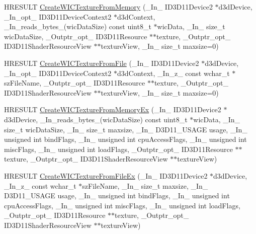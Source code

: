 \begin{DoxyCompactItemize}
\item 
H\+R\+E\+S\+U\+LT \hyperlink{namespace_direct_x_aee4c0625ab4946a88b594747ccca02a2}{Create\+W\+I\+C\+Texture\+From\+Memory} (\+\_\+\+In\+\_\+ I\+D3\+D11\+Device2 $\ast$d3d\+Device, \+\_\+\+In\+\_\+opt\+\_\+ I\+D3\+D11\+Device\+Context2 $\ast$d3d\+Context, \+\_\+\+In\+\_\+reads\+\_\+bytes\+\_\+(wic\+Data\+Size) const uint8\+\_\+t $\ast$wic\+Data, \+\_\+\+In\+\_\+ size\+\_\+t wic\+Data\+Size, \+\_\+\+Outptr\+\_\+opt\+\_\+ I\+D3\+D11\+Resource $\ast$$\ast$texture, \+\_\+\+Outptr\+\_\+opt\+\_\+ I\+D3\+D11\+Shader\+Resource\+View $\ast$$\ast$texture\+View, \+\_\+\+In\+\_\+ size\+\_\+t maxsize=0)
\item 
H\+R\+E\+S\+U\+LT \hyperlink{namespace_direct_x_aed2499ffac60681805e94cb9161e3210}{Create\+W\+I\+C\+Texture\+From\+File} (\+\_\+\+In\+\_\+ I\+D3\+D11\+Device2 $\ast$d3d\+Device, \+\_\+\+In\+\_\+opt\+\_\+ I\+D3\+D11\+Device\+Context2 $\ast$d3d\+Context, \+\_\+\+In\+\_\+z\+\_\+ const wchar\+\_\+t $\ast$sz\+File\+Name, \+\_\+\+Outptr\+\_\+opt\+\_\+ I\+D3\+D11\+Resource $\ast$$\ast$texture, \+\_\+\+Outptr\+\_\+opt\+\_\+ I\+D3\+D11\+Shader\+Resource\+View $\ast$$\ast$texture\+View, \+\_\+\+In\+\_\+ size\+\_\+t maxsize=0)
\item 
H\+R\+E\+S\+U\+LT \hyperlink{namespace_direct_x_acbd72a6ff081831b226b6190f7736794}{Create\+W\+I\+C\+Texture\+From\+Memory\+Ex} (\+\_\+\+In\+\_\+ I\+D3\+D11\+Device2 $\ast$d3d\+Device, \+\_\+\+In\+\_\+reads\+\_\+bytes\+\_\+(wic\+Data\+Size) const uint8\+\_\+t $\ast$wic\+Data, \+\_\+\+In\+\_\+ size\+\_\+t wic\+Data\+Size, \+\_\+\+In\+\_\+ size\+\_\+t maxsize, \+\_\+\+In\+\_\+ D3\+D11\+\_\+\+U\+S\+A\+GE usage, \+\_\+\+In\+\_\+ unsigned int bind\+Flags, \+\_\+\+In\+\_\+ unsigned int cpu\+Access\+Flags, \+\_\+\+In\+\_\+ unsigned int misc\+Flags, \+\_\+\+In\+\_\+ unsigned int load\+Flags, \+\_\+\+Outptr\+\_\+opt\+\_\+ I\+D3\+D11\+Resource $\ast$$\ast$texture, \+\_\+\+Outptr\+\_\+opt\+\_\+ I\+D3\+D11\+Shader\+Resource\+View $\ast$$\ast$texture\+View)
\item 
H\+R\+E\+S\+U\+LT \hyperlink{namespace_direct_x_a58a3ee8268bddcc6016b25e68d08447f}{Create\+W\+I\+C\+Texture\+From\+File\+Ex} (\+\_\+\+In\+\_\+ I\+D3\+D11\+Device2 $\ast$d3d\+Device, \+\_\+\+In\+\_\+z\+\_\+ const wchar\+\_\+t $\ast$sz\+File\+Name, \+\_\+\+In\+\_\+ size\+\_\+t maxsize, \+\_\+\+In\+\_\+ D3\+D11\+\_\+\+U\+S\+A\+GE usage, \+\_\+\+In\+\_\+ unsigned int bind\+Flags, \+\_\+\+In\+\_\+ unsigned int cpu\+Access\+Flags, \+\_\+\+In\+\_\+ unsigned int misc\+Flags, \+\_\+\+In\+\_\+ unsigned int load\+Flags, \+\_\+\+Outptr\+\_\+opt\+\_\+ I\+D3\+D11\+Resource $\ast$$\ast$texture, \+\_\+\+Outptr\+\_\+opt\+\_\+ I\+D3\+D11\+Shader\+Resource\+View $\ast$$\ast$texture\+View)

\end{DoxyCompactItemize}
